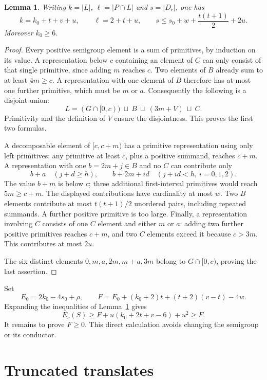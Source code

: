 \documentclass[11pt]{article}
\newtheorem{lemma}[theorem]{Lemma}
\newcommand{\card}[1]{\lvert #1\rvert}
\begin{document}
\begin{lemma}\label{lem:counts}
Writing $k=\card L$, $\ell=\card{P\cap L}$ and $s=\card{D_c}$, one has
\[
 k=k_0+t+v+u,\qquad \ell=2+t+u,\qquad
 s\leq s_0+w+\frac{t(t+1)}2+2u.
\]
Moreover $k_0\geq6$.
\end{lemma}
\begin{proof}
Every positive semigroup element is a sum of primitives, by induction on
its value. A representation below $c$ containing an element of $C$
can only consist of that single primitive, since adding $m$ reaches $c$.
Two elements of $B$ already sum to at least $4m\geq c$.
A representation with one element of $B$ therefore has at most one further
primitive, which must be $m$ or $a$. Consequently the following is a
disjoint union:
\[
 L=(G\cap[0,c))\ \sqcup\ B\ \sqcup\ (3m+V)\ \sqcup\ C.
\]
Primitivity and the definition of $V$ ensure the disjointness. This proves
the first two formulas.

A decomposable element of $[c,c+m)$ has a primitive representation using
only left primitives: any primitive at least $c$, plus a positive
summand, reaches $c+m$. A representation with one $b=2m+j\in B$ and no
$C$ can contribute only
\[
 b+a\quad(j+d\geq h),\qquad
 b+2m+i d\quad(j+i d<h,\ i=0,1,2).
\]
The value $b+m$ is below $c$; three additional first-interval primitives
would reach $5m\geq c+m$. The displayed contributions have cardinality
at most $w$. Two $B$ elements contribute at most $t(t+1)/2$ unordered
pairs, including repeated summands. A further positive primitive is too
large. Finally, a representation involving $C$ consists of one $C$
element and either $m$ or $a$: adding two further positive primitives
reaches $c+m$, and two $C$ elements exceed it because $c>3m$.
This contributes at most $2u$.

The six distinct elements $0,m,a,2m,m+a,3m$ belong to $G\cap[0,c)$,
proving the last assertion.
\end{proof}

Set
\[
 E_0=2k_0-4s_0+\rho,\qquad
 F=E_0+(k_0+2)t+(t+2)(v-t)-4w.
\]
Expanding the inequalities of Lemma~\ref{lem:counts} gives
\begin{equation}\label{eq:core}
 E_c(S)\geq F+u(k_0+2t+v-6)+u^2\geq F.
\end{equation}
It remains to prove $F\geq0$. This direct calculation avoids changing
the semigroup or its conductor.

\section{Truncated translates}
\end{document}
